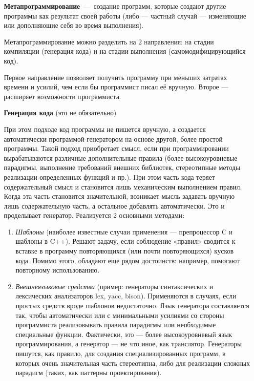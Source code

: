 \documentclass{article}
\begin{document}
\textbf{Метапрограммирование}~---~создание программ, которые создают другие программы как результат своей работы (либо — частный случай — изменяющие или дополняющие себя во время выполнения).

Метапрограммирование можно разделить на 2 направления: на стадии компиляции (генерация кода) и на стадии выполнения (самомодифицирующийся код).

Первое направление позволяет получить программу при меньших затратах времени и усилий, чем если бы программист писал её вручную. Второе — расширяет возможности программиста.

\textbf{Генерация кода} (это не обязательно)

При этом подходе код программы не пишется вручную, а создается автоматически программой-генератором на основе другой, более простой программы.
Такой подход приобретает смысл, если при программировании вырабатываются различные дополнительные правила (более высокоуровневые парадигмы, выполнение требований внешних библиотек, стереотипные методы реализации определенных функций и пр.). При этом часть кода теряет содержательный смысл и становится лишь механическим выполнением правил. Когда эта часть становится значительной, возникает мысль задавать вручную лишь содержательную часть, а остальное добавлять автоматически. Это и проделывает генератор. Реализуется 2 основными методами:

\begin{enumerate}
	\item  \emph{Шаблоны} (наиболее известные случаи применения — препроцессор C и шаблоны в C++). Решают задачу, если соблюдение «правил» сводится к вставке в программу повторяющихся (или почти повторяющихся) кусков кода. Помимо этого, обладают еще рядом достоинств: например, помогают повторному использованию.
	\item \emph{Внешнеязыковые средства} (пример: генераторы синтаксических и лексических анализаторов lex, yacc, bison). Применяются в случаях, если простых средств вроде шаблонов недостаточно. Язык генератора составляется так, чтобы автоматически или с минимальными усилиями со стороны программиста реализовывать правила парадигмы или необходимые специальные функции. Фактически, это — более высокоуровневый язык программирования, а генератор — не что иное, как транслятор.
	Генераторы пишутся, как правило, для создания специализированных программ, в которых очень значительная часть стереотипна, либо для реализации сложных парадигм (таких, как паттерны проектирования).
\end{enumerate}
\end{document}
